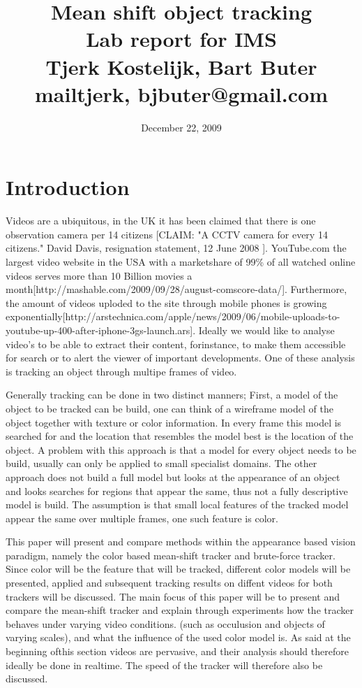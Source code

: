 \documentclass[a4paper,11pt]{article}
\title{Mean shift object tracking\\ Lab report for IMS\\ Tjerk Kostelijk, Bart Buter\\{mailtjerk, bjbuter}@gmail.com}
\date{December 22, 2009}
\begin{document}
\maketitle
\section{Introduction}
Videos are a ubiquitous, in the UK it has been claimed that there is one observation camera per 14 citizens [CLAIM: "A CCTV camera for every 14 citizens."
David Davis, resignation statement, 12 June 2008 ]. YouTube.com the largest video website in the USA with a marketshare of 99\% of all watched online videos serves more than 10 Billion movies a month[http://mashable.com/2009/09/28/august-comscore-data/]. 
Furthermore, the amount of videos uploded to the site through mobile phones is growing exponentially[http://arstechnica.com/apple/news/2009/06/mobile-uploads-to-youtube-up-400-after-iphone-3gs-launch.ars].
Ideally we would like to analyse video's to be able to extract their content, forinstance, to make them accessible for search or to alert the viewer of important developments. One of these analysis is tracking an object through multipe frames of video.

Generally tracking can be done in two distinct manners; First, a model of the object to be tracked can be build, one can think of a wireframe model of the object together with texture or color information. 
In every frame this model is searched for and the location that resembles the model best is the location of the object. A problem with this approach is that a model for every object needs to be build, usually can only be applied to small specialist domains. 
The other approach does not build a full model but looks at the appearance of an object and looks searches for regions that appear the same, thus not a fully descriptive model is build. 
The assumption is that small local features of the tracked model appear the same over multiple frames, one such feature is color.

This paper will present and compare methods within the appearance based vision paradigm, namely the color based mean-shift tracker and brute-force tracker. 
Since color will be the feature that will be tracked, different color models will be presented, applied and subsequent tracking results on diffent videos for both trackers will be discussed.
The main focus of this paper will be to present and compare the mean-shift tracker and explain through experiments how the tracker behaves under varying video conditions. (such as occulusion and objects of varying scales), and what the influence of the used color model is.
As said at the beginning ofthis section videos are pervasive, and their analysis should therefore ideally be done in realtime. The speed of the tracker will therefore also be discussed.
\end{document}
